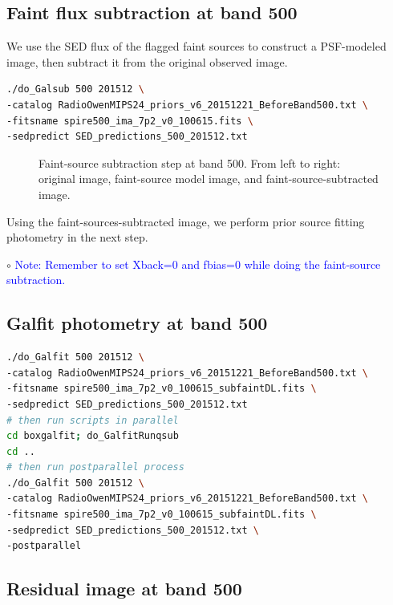 \documentclass[11pt,a4paper]{article}
\begin{document}
\subsection{Faint flux subtraction at band 500}
\label{Band500_Galsub}

We use the SED flux of the flagged faint sources to construct a PSF-modeled image, then subtract it from the original observed image. 

\begin{lstlisting}[language=bash]
./do_Galsub 500 201512 \
-catalog RadioOwenMIPS24_priors_v6_20151221_BeforeBand500.txt \
-fitsname spire500_ima_7p2_v0_100615.fits \
-sedpredict SED_predictions_500_201512.txt
\end{lstlisting}

\begin{figure}[H]
	\caption{Faint-source subtraction step at band 500. From left to right: original image, faint-source model image, and faint-source-subtracted image.}
\end{figure}

Using the faint-sources-subtracted image, we perform prior source fitting photometry in the next step. 

\indent\hspace{15pt}$\circ$ 
\textcolor{blue}{Note: Remember to set Xback=0 and fbias=0 while doing the faint-source subtraction.}
\\

\subsection{Galfit photometry at band 500}
\label{Band500_Galfit}

\begin{lstlisting}[language=bash]
./do_Galfit 500 201512 \
-catalog RadioOwenMIPS24_priors_v6_20151221_BeforeBand500.txt \
-fitsname spire500_ima_7p2_v0_100615_subfaintDL.fits \
-sedpredict SED_predictions_500_201512.txt
# then run scripts in parallel 
cd boxgalfit; do_GalfitRunqsub
cd ..
# then run postparallel process
./do_Galfit 500 201512 \
-catalog RadioOwenMIPS24_priors_v6_20151221_BeforeBand500.txt \
-fitsname spire500_ima_7p2_v0_100615_subfaintDL.fits \
-sedpredict SED_predictions_500_201512.txt \
-postparallel
\end{lstlisting}

\subsection{Residual image at band 500}
\label{Band500_Galres}
\end{document}
